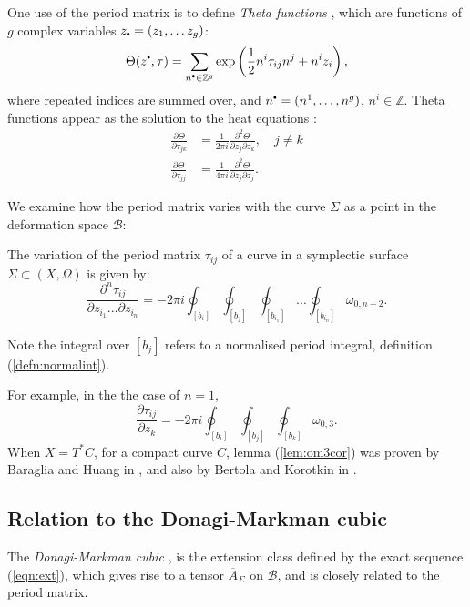     \begin{ex}
    One use of the period matrix is to define \emph{Theta functions} \cite{fay,bertola}, which are functions of \(g\) complex variables \(z_{\sbt} = (z_1, \dots z_g)\):
     \[ \Theta(z^{\sbt},\tau) = \sum_{n^{\sbt} \in \mathbb{Z}^g} \exp \left( \frac{1}{2} n^i \tau_{ij} n^j + n^i z_i \right),\]
    where repeated indices are summed over, and \( n^{\sbt} = (n^1, \dots , n^g)\), \( n^i \in \mathbb{Z}\). Theta functions appear as the solution to the heat equations \cite{bertola}:
    \begin{align*}
        \frac{\partial \Theta}{\partial \tau_{jk}} &= \frac{1}{2 \pi i } \frac{\partial^2 \Theta}{\partial z_j \partial z_k}, \quad j \neq k \\
        \frac{\partial \Theta}{\partial \tau_{jj}} &= \frac{1}{4 \pi i } \frac{\partial^2 \Theta}{\partial z_j \partial z_j}.
    \end{align*}
    \end{ex}

    We examine how the period matrix varies with the curve \(\Sigma\) as a point in the deformation space \( \mathcal{B}\):
    \begin{lem} 
    \label{lem:om3cor}
    The variation of the period matrix \(\tau_{ij}\) of a curve in a symplectic surface \(\Sigma\subset (X,\Omega)\) is given by:
    \[\frac{\partial^n\tau_{ij}}{\partial z_{i_1}...\partial z_{i_n}}=-2\pi i \oint_{[b_i]}\oint_{[b_j]}\oint_{[b_{i_1}] }...\oint_{[b_{i_n}]}\omega_{0,n+2}.\] 
    \end{lem}
    Note the integral over \([b_j]\) refers to a normalised period integral, definition (\ref{defn:normalint}).
    
    For example, in the the case of \(n=1\), 
    \[ \frac{\partial\tau_{ij}}{\partial z_k}= -2\pi i \oint_{[b_i]}\oint_{[b_j]}\oint_{[b_k]}\omega_{0,3}.\]
    When \(X=T^*C\), for a compact curve \(C\), lemma (\ref{lem:om3cor}) was proven by Baraglia and Huang in \cite{bhuespe}, and also by Bertola and Korotkin in \cite{bkospa}. 

    \subsection{Relation to the Donagi-Markman cubic}
    
    The \emph{Donagi-Markman cubic} \cite{domacubic}, is the extension class defined by the exact sequence (\ref{eqn:ext}), which gives rise to a tensor \( \overline{A}_\Sigma\) on \(\mathcal{B}\), and is closely related to the period matrix.
    
